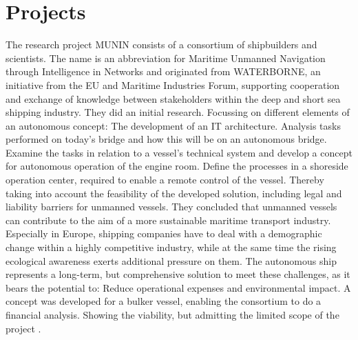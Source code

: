 \section{Projects}
The research project MUNIN consists of a consortium of shipbuilders and scientists. The name is an abbreviation for Maritime Unmanned Navigation through Intelligence in Networks and originated from WATERBORNE, an initiative from the EU and Maritime Industries Forum, supporting cooperation and exchange of knowledge between stakeholders within the deep and short sea shipping industry. They did an initial research. Focussing on different elements of an autonomous concept: The development of an IT architecture. Analysis tasks performed on today's bridge and how this will be on an autonomous bridge. Examine the tasks in relation to a vessel’s technical system and develop a concept for autonomous operation of the engine room. Define the processes in a shoreside operation center, required to enable a remote control of the vessel. Thereby taking into account the feasibility of the developed solution, including legal and liability barriers for unmanned vessels.
They concluded that unmanned vessels can contribute to the aim of a more sustainable maritime transport industry. Especially in Europe, shipping companies have to deal with a demographic change within a highly competitive industry, while at the same time the rising ecological awareness exerts additional pressure on them. The autonomous ship represents a long-term, but comprehensive solution to meet these challenges, as it bears the potential to: Reduce operational expenses and
environmental impact.
A concept was developed for a bulker vessel, enabling the consortium to do a financial analysis. Showing the viability, but admitting the limited scope of the project \cite{MUNIN2016}.

